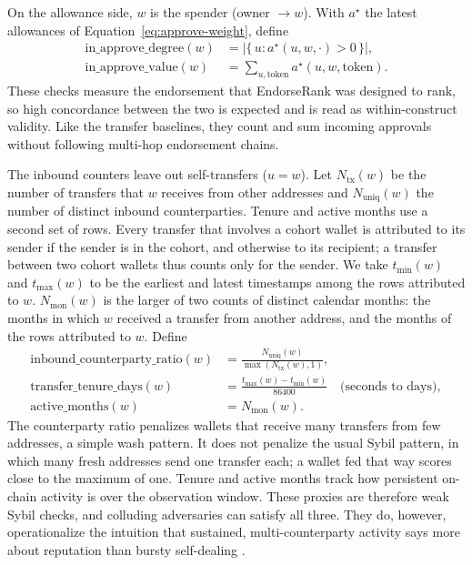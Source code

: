 
On the allowance side, $w$ is the spender (owner $\to w$). With $a^{\star}$ the latest allowances of Equation~\eqref{eq:approve-weight}, define
\begin{align}
\mathrm{in\_approve\_degree}(w)
&=
\bigl|\{\,u : a^{\star}(u,w,\cdot)>0\,\}\bigr|,
\label{eq:in-approve-degree}\\
\mathrm{in\_approve\_value}(w)
&=
\sum_{u,\mathrm{token}} a^{\star}(u,w,\mathrm{token}).
\label{eq:in-approve-value}
\end{align}
These checks measure the endorsement that EndorseRank was designed to rank, so high concordance between the two is expected and is read as within-construct validity. Like the transfer baselines, they count and sum incoming approvals without following multi-hop endorsement chains.


The inbound counters leave out self-transfers ($u=w$). Let $N_{\mathrm{tx}}(w)$ be the number of transfers that $w$ receives from other addresses and $N_{\mathrm{uniq}}(w)$ the number of distinct inbound counterparties. Tenure and active months use a second set of rows. Every transfer that involves a cohort wallet is attributed to its sender if the sender is in the cohort, and otherwise to its recipient; a transfer between two cohort wallets thus counts only for the sender. We take $t_{\min}(w)$ and $t_{\max}(w)$ to be the earliest and latest timestamps among the rows attributed to $w$. $N_{\mathrm{mon}}(w)$ is the larger of two counts of distinct calendar months: the months in which $w$ received a transfer from another address, and the months of the rows attributed to $w$. Define
\begin{align}
\mathrm{inbound\_counterparty\_ratio}(w)
&=
\frac{N_{\mathrm{uniq}}(w)}{\max(N_{\mathrm{tx}}(w),1)},
\label{eq:counterparty-ratio}\\
\mathrm{transfer\_tenure\_days}(w)
&=
\frac{t_{\max}(w)-t_{\min}(w)}{86400}\quad\text{(seconds to days)},
\label{eq:tenure}\\
\mathrm{active\_months}(w)
&=
N_{\mathrm{mon}}(w).
\label{eq:active-months}
\end{align}
The counterparty ratio penalizes wallets that receive many transfers from few addresses, a simple wash pattern. It does not penalize the usual Sybil pattern, in which many fresh addresses send one transfer each; a wallet fed that way scores close to the maximum of one. Tenure and active months track how persistent on-chain activity is over the observation window. These proxies are therefore weak Sybil checks, and colluding adversaries can satisfy all three. They do, however, operationalize the intuition that sustained, multi-counterparty activity says more about reputation than bursty self-dealing .

